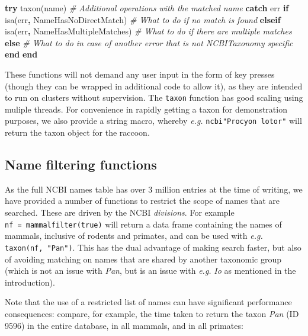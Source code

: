 \documentclass[10pt,oneside]{article}
\newenvironment{Shaded}{\begin{snugshade}}{\end{snugshade}}
\newcommand{\KeywordTok}[1]{\textcolor[rgb]{0.13,0.29,0.53}{\textbf{#1}}}
\newcommand{\CommentTok}[1]{\textcolor[rgb]{0.56,0.35,0.01}{\textit{#1}}}
\newcommand{\OperatorTok}[1]{\textcolor[rgb]{0.81,0.36,0.00}{\textbf{#1}}}
\newcommand{\NormalTok}[1]{#1}
\begin{document}
\begin{Shaded}
\begin{Highlighting}[]
\KeywordTok{try}
\NormalTok{  taxon(name)}
  \CommentTok{\# Additional operations with the matched name}
\KeywordTok{catch}\NormalTok{ err}
  \KeywordTok{if}\NormalTok{ isa(err}\OperatorTok{,}\NormalTok{ NameHasNoDirectMatch)}
    \CommentTok{\# What to do if no match is found}
  \KeywordTok{elseif}\NormalTok{ isa(err}\OperatorTok{,}\NormalTok{ NameHasMultipleMatches)}
    \CommentTok{\# What to do if there are multiple matches}
  \KeywordTok{else}
    \CommentTok{\# What to do in case of another error that is not NCBITaxonomy specific}
  \KeywordTok{end}
\KeywordTok{end}
\end{Highlighting}
\end{Shaded}

These functions will not demand any user input in the form of key
presses (though they can be wrapped in additional code to allow it), as
they are intended to run on clusters without supervision. The
\texttt{taxon} function has good scaling using muliple threads. For
convenience in rapidly getting a taxon for demonstration purposes, we
also provide a string macro, whereby \emph{e.g.}
\texttt{ncbi"Procyon\ lotor"} will return the taxon object for the
raccoon.

\hypertarget{name-filtering-functions}{%
\subsection{Name filtering functions}\label{name-filtering-functions}}

As the full NCBI names table has over 3 million entries at the time of
writing, we have provided a number of functions to restrict the scope of
names that are searched. These are driven by the NCBI \emph{divisions}.
For example \texttt{nf\ =\ mammalfilter(true)} will return a data frame
containing the names of mammals, inclusive of rodents and primates, and
can be used with \emph{e.g.} \texttt{taxon(nf,\ "Pan")}. This has the
dual advantage of making search faster, but also of avoiding matching on
names that are shared by another taxonomic group (which is not an issue
with \emph{Pan}, but is an issue with \emph{e.g.} \emph{Io} as mentioned
in the introduction).

Note that the use of a restricted list of names can have significant
performance consequences: compare, for example, the time taken to return
the taxon \emph{Pan} (ID 9596) in the entire database, in all mammals,
and in all primates:
\end{document}
